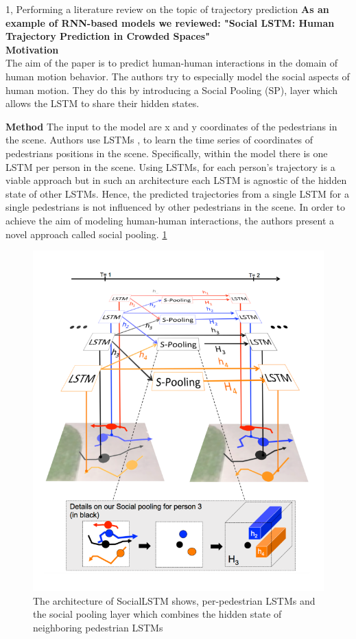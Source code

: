 \documentclass[10pt,a4paper]{article}
\begin{document}
\begin{task}{1, Performing a literature review on the topic of trajectory prediction}
    \textbf{As an example of RNN-based models we reviewed: "Social LSTM: Human Trajectory Prediction in Crowded Spaces" \cite{social_pooling}} \\
    
    \textbf{Motivation} \\
    The aim of the paper is to predict human-human interactions in the domain of human motion behavior. The authors try to especially model the social aspects of human motion. They do this by introducing a Social Pooling (SP), layer which allows the LSTM to share their hidden states.
    
    \textbf{Method}
    The input to the model are x and y coordinates of the pedestrians in the scene. Authors use LSTMs \cite{lstm}, to learn the time series of coordinates of pedestrians positions in the scene. Specifically, within the model there is one LSTM per person in the scene. Using LSTMs, for each person's trajectory is a viable approach but in such an architecture each LSTM is agnostic of the hidden state of other LSTMs. Hence, the predicted trajectories from a single LSTM for a single pedestrians is not influenced by other pedestrians in the scene. In order to achieve the aim of modeling human-human interactions, the authors present a novel approach called social pooling. \ref{fig:social_lstm}
    
    \begin{figure}[H]
        \centering
        \includegraphics[scale=0.25]{pictures/SocialLSTM.png}
        \caption{The architecture of SocialLSTM shows, per-pedestrian LSTMs and the social pooling layer which combines the hidden state of neighboring pedestrian LSTMs}
        \label{fig:social_lstm}
    \end{figure}
    

\end{task}
\end{document}
